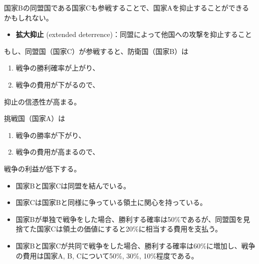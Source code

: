 \documentclass[
  xelatex,
  ja=standard]{bxjsarticle}
\providecommand{\tightlist}{%
  \setlength{\itemsep}{0pt}\setlength{\parskip}{0pt}}\usepackage{longtable,booktabs,array}
\begin{document}
国家Bの同盟国である国家Cも参戦することで、国家Aを抑止することができるかもしれない。

\begin{itemize}
\tightlist
\item
  \textbf{拡大抑止} (extended
  deterrence)：同盟によって他国への攻撃を抑止すること
\end{itemize}

もし、同盟国（国家C）が参戦すると、防衛国（国家B）は

\begin{enumerate}
\def\labelenumi{\arabic{enumi}.}
\tightlist
\item
  戦争の勝利確率が上がり、
\item
  戦争の費用が下がるので、
\end{enumerate}

抑止の信憑性が高まる。

挑戦国（国家A）は

\begin{enumerate}
\def\labelenumi{\arabic{enumi}.}
\tightlist
\item
  戦争の勝率が下がり、
\item
  戦争の費用が高まるので、
\end{enumerate}

戦争の利益が低下する。

\begin{tcolorbox}[enhanced jigsaw, opacityback=0, leftrule=.75mm, toptitle=1mm, colframe=quarto-callout-tip-color-frame, arc=.35mm, bottomrule=.15mm, coltitle=black, bottomtitle=1mm, colbacktitle=quarto-callout-tip-color!10!white, titlerule=0mm, breakable, title=\textcolor{quarto-callout-tip-color}{\faLightbulb}\hspace{0.5em}{同盟国のいる国際危機のシナリオ1}, left=2mm, rightrule=.15mm, toprule=.15mm, opacitybacktitle=0.6, colback=white]

\begin{itemize}
\tightlist
\item
  国家Bと国家Cは同盟を結んでいる。
\item
  国家Cは国家Bと同様に争っている領土に関心を持っている。
\item
  国家Bが単独で戦争をした場合、勝利する確率は50\%であるが、同盟国を見捨てた国家Cは領土の価値にすると20\%に相当する費用を支払う。
\item
  国家Bと国家Cが共同で戦争をした場合、勝利する確率は60\%に増加し、戦争の費用は国家A,
  B, Cについて50\%, 30\%, 10\%程度である。
\end{itemize}

\end{tcolorbox}
\end{document}
